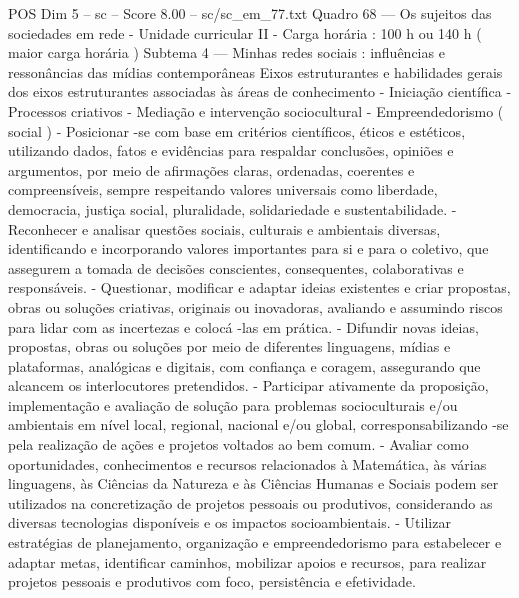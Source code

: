 \begin{textsample}{POS Dim 5 – sc – Score 8.00 – sc/sc\_em\_77.txt}
Quadro 68 — Os sujeitos das sociedades em rede - Unidade curricular II - Carga horária : 100 h ou 140 h ( maior carga horária ) Subtema 4 — Minhas redes sociais : influências e ressonâncias das mídias contemporâneas Eixos estruturantes e habilidades gerais dos eixos estruturantes associadas às áreas de conhecimento - Iniciação científica - Processos criativos - Mediação e intervenção sociocultural - Empreendedorismo ( social ) - Posicionar -se com base em critérios científicos, éticos e estéticos, utilizando dados, fatos e evidências para respaldar conclusões, opiniões e argumentos, por meio de afirmações claras, ordenadas, coerentes e compreensíveis, sempre respeitando valores universais como liberdade, democracia, justiça social, pluralidade, solidariedade e sustentabilidade. - Reconhecer e analisar questões sociais, culturais e ambientais diversas, identificando e incorporando valores importantes para si e para o coletivo, que assegurem a tomada de decisões conscientes, consequentes, colaborativas e responsáveis. - Questionar, modificar e adaptar ideias existentes e criar propostas, obras ou soluções criativas, originais ou inovadoras, avaliando e assumindo riscos para lidar com as incertezas e colocá -las em prática. - Difundir novas ideias, propostas, obras ou soluções por meio de diferentes linguagens, mídias e plataformas, analógicas e digitais, com confiança e coragem, assegurando que alcancem os interlocutores pretendidos. - Participar ativamente da proposição, implementação e avaliação de solução para problemas socioculturais e/ou ambientais em nível local, regional, nacional e/ou global, corresponsabilizando -se pela realização de ações e projetos voltados ao bem comum. - Avaliar como oportunidades, conhecimentos e recursos relacionados à Matemática, às várias linguagens, às Ciências da Natureza e às Ciências Humanas e Sociais podem ser utilizados na concretização de projetos pessoais ou produtivos, considerando as diversas tecnologias disponíveis e os impactos socioambientais. - Utilizar estratégias de planejamento, organização e empreendedorismo para estabelecer e adaptar metas, identificar caminhos, mobilizar apoios e recursos, para realizar projetos pessoais e produtivos com foco, persistência e efetividade.

\end{textsample}
